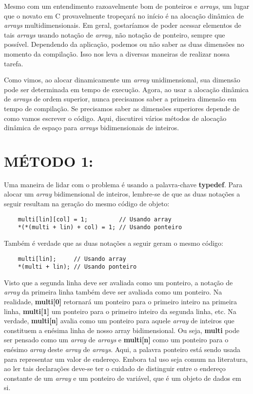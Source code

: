 Mesmo com um entendimento razoavelmente bom de ponteiros e \textit{arrays}, um lugar que o novato em C provavelmente tropeçará no início é na alocação dinâmica de \textit{arrays} multidimensionais. Em geral, gostaríamos de poder acessar elementos de tais \textit{arrays} usando notação de \textit{array}, não notação de ponteiro, sempre que possível. Dependendo da aplicação, podemos ou não saber as duas dimensões no momento da compilação. Isso nos leva a diversas maneiras de realizar nossa tarefa.

Como vimos, ao alocar dinamicamente um \textit{array} unidimensional, sua dimensão pode ser determinada em tempo de execução. Agora, ao usar a alocação dinâmica de \textit{arrays} de ordem superior, nunca precisamos saber a primeira dimensão em tempo de compilação. Se precisamos saber as dimensões superiores depende de como vamos escrever o código. Aqui, discutirei vários métodos de alocação dinâmica de espaço para \textit{arrays} bidimensionais de inteiros.

\section*{MÉTODO 1:}
Uma maneira de lidar com o problema é usando a palavra-chave \textbf{typedef}. Para alocar um \textit{array} bidimensional de inteiros, lembre-se de que as duas notações a seguir resultam na geração do mesmo código de objeto:
\begin{lstlisting}
	multi[lin][col] = 1;         // Usando array
	*(*(multi + lin) + col) = 1; // Usando ponteiro
\end{lstlisting}

Também é verdade que as duas notações a seguir geram o mesmo código:
\begin{lstlisting}
	multi[lin];     // Usando array
	*(multi + lin); // Usando ponteiro
\end{lstlisting}

Visto que a segunda linha deve ser avaliada como um ponteiro, a notação de \textit{array} da primeira linha também deve ser avaliada como um ponteiro. Na realidade, \textbf{multi[0]} retornará um ponteiro para o primeiro inteiro na primeira linha, \textbf{multi[1]} um ponteiro para o primeiro inteiro da segunda linha, etc. Na verdade, \textbf{multi[n]} avalia como um ponteiro para aquele \textit{array} de inteiros que constituem a enésima linha de nosso array bidimensional. Ou seja, \textbf{multi} pode ser pensado como um \textit{array} de \textit{arrays} e \textbf{multi[n]} como um ponteiro para o enésimo \textit{array} deste \textit{array} de \textit{arrays}. Aqui, a palavra ponteiro está sendo usada para representar um valor de endereço. Embora tal uso seja comum na literatura, ao ler tais declarações deve-se ter o cuidado de distinguir entre o endereço constante de um \textit{array} e um ponteiro de variável, que é um objeto de dados em si.

